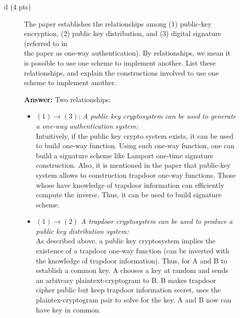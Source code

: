 \documentclass[11pt]{article}
\newcommand{\ans}[1]{\begin{mdframed}\textbf{Answer: }#1\end{mdframed}}
\begin{document}
\begin{description}
\begin{description}
{\begin{itemize}
  \end{itemize}
}
 \item [d (4 pts)]
The paper establishes the relationships among (1) public-key encryption,
(2) public key distribution, and (3) digital signature (referred to in\\
the paper as one-way authentication).  By relationships, we mean it is possible to use
one scheme to implement another.  List these relationships, and
explain the constructions involved to use one scheme to implement
another.
\ans{
  Two relationships:
  \begin{itemize}
    \item $(1)\rightarrow (3)$: \textit{A public key cryptosystem can be used to generate a one-way authentication system:}
    \\ Intuitively, if the public key crypto system exists, it can be used to build one-way function. Using such one-way function, one can build a signature scheme like Lamport one-time signature construction. Also, it is mentioned in the paper that public-key system allows to construction trapdoor one-way functions. Those whose have knowledge of trapdoor information can efficiently compute the inverse. Thus, it can be used to build signature scheme.
    \item $(1) \rightarrow (2)$ \textit{A trapdoor cryptosystem can be used to produce a public key distribution system:}
    \\As described above, a public key cryptosystem implies the existence of a trapdoor one-way function (can be inverted with the knowledge of trapdoor information). Thus, for A and B to establish a common key. A chooses a key at random and sends an arbitrary plaintext-cryptogram to B. B makes trapdoor cipher public but keep trapdoor information secret, uses the plaintex-cryptogram pair to solve for the key. A and B now can have key in common.
  \end{itemize}
}
\end{description}



\end{description}
\end{document}
